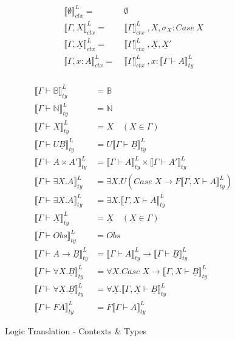 \documentclass[acmsmall]{acmart}
\newcommand{\den}[1]{\llbracket #1\rrbracket}
\newcommand{\denLty}[1]{\den{#1}^L_{ty}}
\begin{document}
\begin{figure}[H]
  \centering
  \footnotesize
  \footnotesize
  \begin{align*}
\den{\emptyset }^L_{ctx} =&\; \emptyset \\
\den{\Gamma,X  }^L_{ctx} =&\; \den{\Gamma }^L_{ctx} \;, X,\sigma_X: Case\:X\\
\den{\Gamma,\underline{X}  }^L_{ctx} =&\; \den{\Gamma }^L_{ctx}\; , \underline{X},\underline{X}'\\
\den{\Gamma, x : A }^L_{ctx} =&\; \den{\Gamma }^L_{ctx}\; , x : \den{\Gamma \vdash A}^L_{ty}\\
\end{align*}

  \begin{align*}
  \denLty{\Gamma \vdash \mathbb{B}} &= \mathbb{B} \\
  \denLty{\Gamma \vdash \mathbb{N}} &= \mathbb{N} \\
  \denLty{\Gamma \vdash X} &= X \quad (X \in \Gamma) \\
  \denLty{\Gamma \vdash U\underline{B}} &= U \denLty{\Gamma \vdash \underline{B}} \\
  \denLty{\Gamma \vdash A \times A'} &= \denLty{\Gamma \vdash A} \times \denLty{\Gamma \vdash A'} \\
  \denLty{\Gamma \vdash \exists X.A} &= \exists X. U(Case\;X \rightarrow F \denLty{\Gamma,X \vdash A}) \\
  \denLty{\Gamma \vdash \exists \underline{X}.A} &= \exists \underline{X}. \denLty{\Gamma,\underline{X} \vdash A} \\
  \denLty{\Gamma \vdash \underline{X}} &= \underline{X} \quad (\underline{X} \in \Gamma) \\
  \denLty{\Gamma \vdash Obs} &= Obs \\
  \denLty{\Gamma \vdash A \rightarrow \underline{B}} &= \denLty{\Gamma \vdash A} \rightarrow \denLty{\Gamma \vdash \underline{B}} \\
  \denLty{\Gamma \vdash \forall X . \underline{B}} &= \forall X. Case \;X \rightarrow \denLty{\Gamma,X \vdash \underline{B}} \\
  \denLty{\Gamma \vdash \forall \underline{X}. \underline{B}} &= \forall \underline{X}. \denLty{\Gamma,\underline{X} \vdash \underline{B}} \\
  \denLty{\Gamma \vdash FA} &= F \denLty{\Gamma \vdash A} 
  \end{align*}
  \caption{Logic Translation - Contexts \& Types}
  \end{figure}
\end{document}
